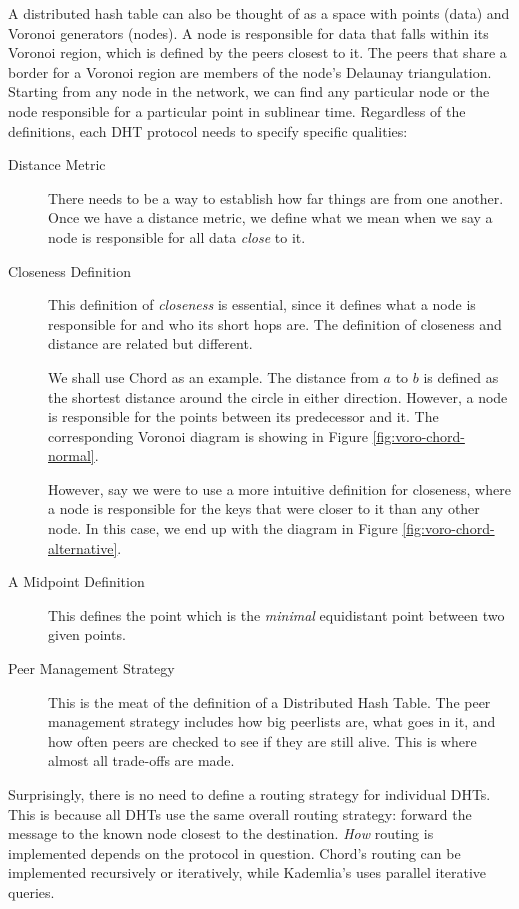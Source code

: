 A distributed hash table can also be thought of as a space with points (data) and Voronoi generators (nodes).
A node is responsible for data that falls within its Voronoi region, which is defined by the peers closest to it.
The peers that share a border for a Voronoi region are members of the node's Delaunay triangulation.
Starting from any node in the network, we can find any particular node or the node responsible for a particular point in sublinear time.
Regardless of the definitions, each DHT protocol needs to specify specific qualities:

\begin{description}
	\item [Distance Metric] There needs to be a way to establish how far things are from one another.
	Once we have a distance metric, we define what we mean when we say a node is responsible for all data \textit{close} to it.
	\item [Closeness Definition] This definition of \textit{closeness} is essential, since it defines what a node is responsible for and who its short hops are.
	The definition of closeness and distance are related but different.
	
	We shall use Chord \cite{chord}  as an example.  
	The distance from $ a $ to $ b $ is defined as the shortest distance around the circle in either direction.
	However, a node is responsible for the points between its predecessor and it.
	The corresponding Voronoi diagram is showing in Figure \ref{fig:voro-chord-normal}.
	
	
	However, say we were to use a more intuitive definition for closeness, where a node is responsible for the keys that were closer to it than any other node.
	In this case, we end up with the diagram in Figure \ref{fig:voro-chord-alternative}.
	\item [A Midpoint Definition] This defines the point which is the \textit{minimal} equidistant point between two given points.
	\item [Peer Management Strategy] This is the meat of the definition of a Distributed Hash Table.
	The peer management strategy includes how big peerlists are, what goes in it, and how often peers are checked to see if they are still alive.
	This is where almost all trade-offs are made.
\end{description}

Surprisingly, there is no need to define a routing strategy for individual DHTs. 
This is because all DHTs use the same overall routing strategy:  forward the message to the known node closest to the destination.
\textit{How} routing is implemented depends on the protocol in question.
Chord's routing can be implemented recursively or iteratively, while Kademlia's uses parallel iterative queries.

